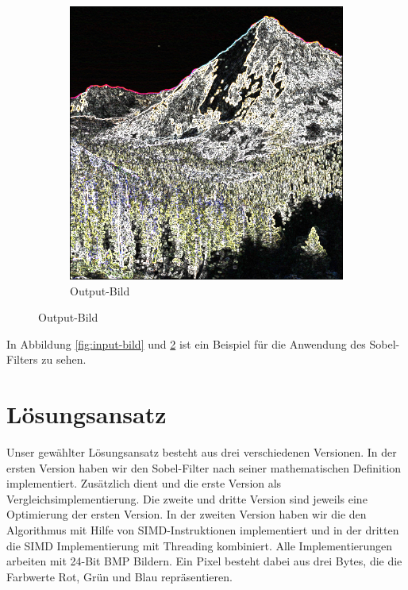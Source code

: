 \documentclass[course=erap]{aspdoc}
\begin{document}
\begin{figure}[H]
\begin{subfigure}{.5\columnwidth}
        \includegraphics[width=\columnwidth]{graphics/johnmuirtrail_sobel.png}
        \caption{Output-Bild}
        \label{fig:output-bild}
    \end{subfigure}
\end{figure}

In Abbildung \ref{fig:input-bild} und \ref{fig:output-bild} ist ein Beispiel für die Anwendung des Sobel-Filters zu sehen.

\section{Lösungsansatz}

Unser gewählter Lösungsansatz besteht aus drei verschiedenen Versionen.
In der ersten Version haben wir den Sobel-Filter nach seiner mathematischen Definition implementiert.
Zusätzlich dient und die erste Version als Vergleichsimplementierung.
Die zweite und dritte Version sind jeweils eine Optimierung der ersten Version.
In der zweiten Version haben wir die den Algorithmus mit Hilfe von SIMD-Instruktionen implementiert und in der dritten die SIMD Implementierung mit Threading kombiniert.
Alle Implementierungen arbeiten mit 24-Bit BMP Bildern. Ein Pixel besteht dabei aus drei Bytes, die die Farbwerte Rot, Grün und Blau repräsentieren.
\end{document}

